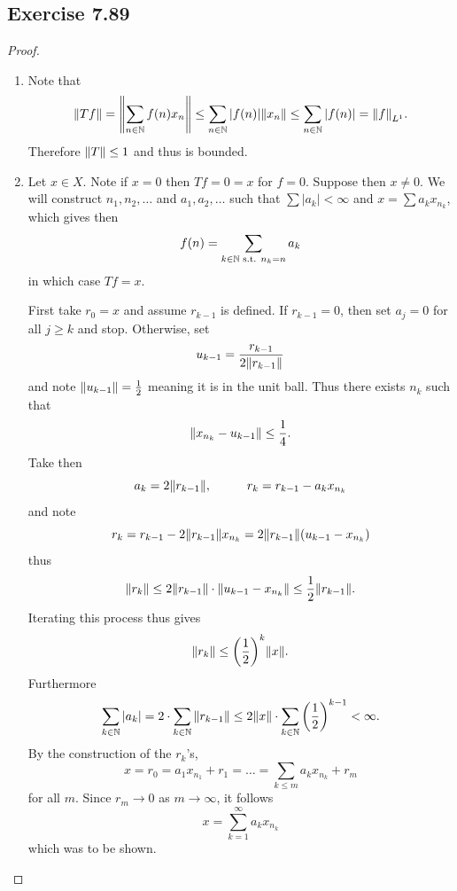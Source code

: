 \documentclass[hw_all.tex]{subfiles}
\begin{document}
\subsection{Exercise 7.89}
\begin{proof}
    \begin{enumerate}
        \item 
            Note that
            \[
                \norm{Tf} = \norm{\sum_{n \in \mathbb{N}} f(n) x_n} \leq \sum_{n \in \mathbb{N}} |f(n)| \norm{x_n} \leq \sum_{n \in \mathbb{N}} |f(n)| = \norm{f}_{L^1}
            .\]
            Therefore $\norm{T} \leq 1$ and thus is bounded.

        \item 
            Let $x \in X$. Note if $x = 0$ then $T f = 0 = x$ for $f = 0$. Suppose then $x \neq 0$. We will construct $n_1, n_2, \ldots$ and $a_1, a_2, \ldots$ such that $\sum |a_k| < \infty$ and $x = \sum a_k x_{n_k}$, which gives then
            \[
                f(n) = \sum_{k \in \mathbb{N} \text{ s.t. } n_k = n} a_k
            \]
            in which case $Tf = x$.

            First take $r_0 = x$ and assume $r_{k - 1}$ is defined. If $r_{k - 1} = 0$, then set $a_j = 0$ for all $j \geq k$ and stop. Otherwise, set
            \[
                u_{k - 1} = \frac{r_{k - 1}}{2 \norm{r_{k-1}}}
            \]
            and note $\norm{u_{k - 1}} = \frac{1}{2}$ meaning it is in the unit ball. Thus there exists $n_k$ such that
            \[
                \norm{x_{n_k} - u_{k-1}} \leq \frac{1}{4}
            .\]
            Take then
            \[
                a_k = 2\norm{r_{k-1}}, \hspace{1cm} r_k = r_{k-1} - a_k x_{n_k}
            \]
            and note
            \[
                r_k = r_{k-1} - 2 \norm{r_{k-1}} x_{n_k} = 2 \norm{r_{k-1}} (u_{k-1} - x_{n_k})
            \]
            thus
            \[
                \norm{r_k} \leq 2 \norm{r_{k-1}} \cdot \norm{u_{k-1} - x_{n_k}} \leq \frac{1}{2} \norm{r_{k-1}}
            .\]
            Iterating this process thus gives
            \[
                \norm{r_k} \leq \qty(\frac{1}{2})^k \norm{x}
            .\]
            Furthermore
            \[
                \sum_{k \in \mathbb{N}} |a_k| = 2 \cdot \sum_{k \in \mathbb{N}} \norm{r_{k-1}} \leq 2 \norm{x} \cdot \sum_{k \in \mathbb{N}} \qty(\frac{1}{2})^{k-1} < \infty
            .\]
            By the construction of the $r_k$'s,
            \[
                x = r_0 = a_1 x_{n_1} + r_1 = \ldots = \sum_{k \leq m} a_k x_{n_k} + r_m
            \]
            for all $m$. Since $r_m \to 0$ as $m \to \infty$, it follows
            \[
                x = \sum_{k = 1}^\infty a_k x_{n_k}
            \]
            which was to be shown.



\end{enumerate}
\end{proof}
\end{document}
